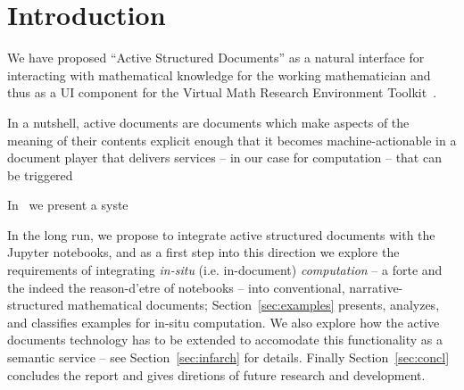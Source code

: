 \section{Introduction}\label{sec:intro}


We have proposed ``Active Structured Documents'' as a natural interface for interacting
with mathematical knowledge for the working mathematician and thus as a UI component for
the \pn Virtual Math Research Environment Toolkit~\cite{ODK-D4.2}.

In a nutshell, active documents are documents which make aspects of the meaning of their
contents explicit enough that it becomes machine-actionable in a document player that
delivers services -- in our case for computation -- that can be triggered 

In~\cite{KohDavGin:psewads11} we
present a syste


In the long run, we propose to integrate active structured documents with the Jupyter
notebooks, and as a first step into this direction we explore the requirements of
integrating \emph{in-situ} (i.e. in-document) \emph{computation} -- a forte and the indeed
the reason-d'etre of notebooks -- into conventional, narrative-structured mathematical
documents; Section~\ref{sec:examples} presents, analyzes, and classifies examples for
in-situ computation.  We also explore how the active documents technology has to be
extended to accomodate this functionality as a semantic service -- see
Section~\ref{sec:infarch} for details. Finally Section~\ref{sec:concl} concludes the report
and gives diretions of future research and development.

